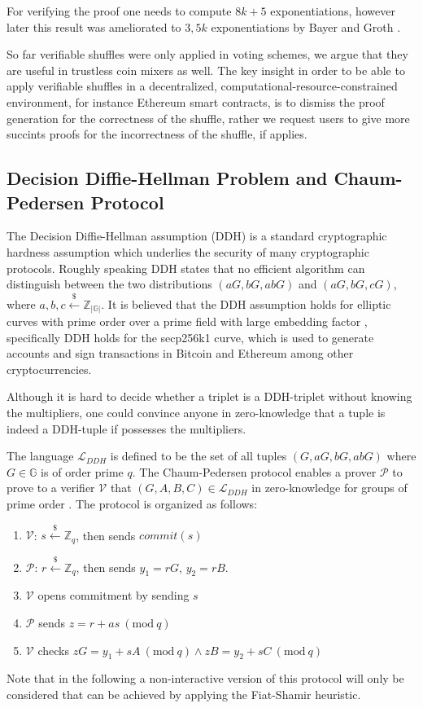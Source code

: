 \documentclass[a4paper]{article}
\theoremstyle{definition}
\newcommand{\Mod}[1]{\ (\mathrm{mod}\ #1)}
\begin{document}
For verifying the proof one needs to compute $8k+5$ exponentiations, however later this result was ameliorated to $3,5k$ exponentiations by Bayer and Groth \cite{bayer2012efficient}.

So far verifiable shuffles were only applied in voting schemes, we argue that they are useful in trustless coin mixers as well. The key insight in order to be able to apply verifiable shuffles in a decentralized, computational-resource-constrained environment, for instance Ethereum smart contracts, is to dismiss the proof generation for the correctness of the shuffle, rather we request users to give more succints proofs for the incorrectness of the shuffle, if applies.   

\subsection{Decision Diffie-Hellman Problem and Chaum-Pedersen Protocol}

The Decision Diffie-Hellman assumption (DDH) is a standard cryptographic hardness assumption which underlies the security of many cryptographic protocols. Roughly speaking DDH states that no efficient algorithm can distinguish between the two distributions $(aG, bG, abG)$ and $(aG, bG, cG)$, where $a,b,c\stackrel{\$}{\leftarrow}\mathbb{Z}_{|\mathbb{G}|}$. It is believed that the DDH assumption holds for elliptic curves with prime order over a prime field with large embedding factor \cite{boneh1998decision}, specifically DDH holds for the secp256k1 curve, which is used to generate accounts and sign transactions in Bitcoin and Ethereum among other cryptocurrencies. 

 Although it is hard to decide whether a triplet is a DDH-triplet without knowing the multipliers, one could convince anyone in zero-knowledge that a tuple is indeed a DDH-tuple if possesses the multipliers.    

The language $\mathcal{L}_{DDH}$ is defined to be the set of all tuples $(G,aG,bG,abG)$ where $G\in \mathbb{G}$ is of order prime $q$. The Chaum-Pedersen protocol enables a prover $\mathcal{P}$ to prove to a verifier $\mathcal{V}$ that $(G,A,B,C)\in\mathcal{L}_{DDH}$ in zero-knowledge for groups of prime order \cite{chaum1992wallet}. The protocol is organized as follows:

\begin{enumerate}
	\item $\mathcal{V}$: $s\stackrel{\$}{\leftarrow}\mathbb{Z}_q$, then sends $commit(s)$ 
	\item $\mathcal{P}$: $r\stackrel{\$}{\leftarrow}\mathbb{Z}_q$, then sends $y_1=rG$, $y_2=rB$.
	\item $\mathcal{V}$ opens commitment by sending $s$
	\item $\mathcal{P}$ sends $z=r+as \Mod{q}$
	\item $\mathcal{V}$ checks $zG=y_{1}+sA \Mod{q} \land zB=y_{2}+sC \Mod{q}$
\end{enumerate} 
Note that in the following a non-interactive version of this protocol will only be considered that can be achieved by applying the Fiat-Shamir heuristic. 
\end{document}
